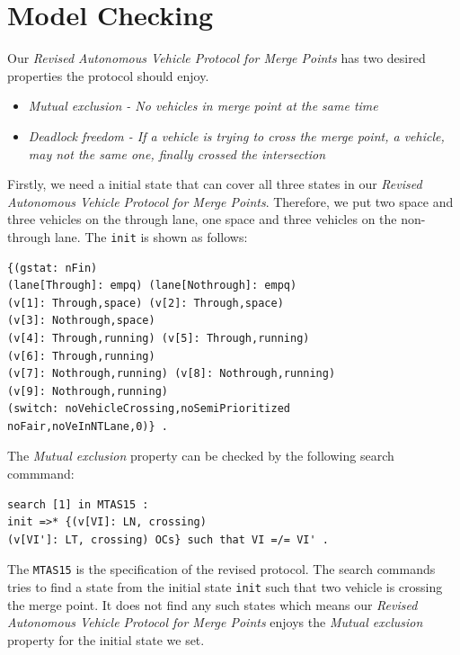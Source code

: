 \documentclass[10pt, conference, compsocconf]{IEEEtran}
\begin{document}
 
\section{Model Checking}
 \label{sect_model}
Our \textit{Revised Autonomous Vehicle Protocol for Merge Points} has two desired properties the protocol should enjoy.
\begin{itemize}
    \item \textit{Mutual exclusion - No vehicles in merge point at the same time}
    \item \textit{Deadlock freedom - If a vehicle is trying to cross the merge point, a vehicle, may not the same one, finally crossed the intersection}
\end{itemize}

Firstly, we need a initial state that can cover all three states in our \textit{Revised Autonomous Vehicle Protocol for Merge Points}.
Therefore, we put two space and three vehicles on the through lane, one space and three vehicles on the non-through lane.
The \verb!init! is shown as follows:

\begin{footnotesize}
\begin{verbatim}
{(gstat: nFin) 
(lane[Through]: empq) (lane[Nothrough]: empq) 
(v[1]: Through,space) (v[2]: Through,space) 
(v[3]: Nothrough,space)
(v[4]: Through,running) (v[5]: Through,running) 
(v[6]: Through,running)
(v[7]: Nothrough,running) (v[8]: Nothrough,running)
(v[9]: Nothrough,running)
(switch: noVehicleCrossing,noSemiPrioritized
noFair,noVeInNTLane,0)} .
\end{verbatim}
\end{footnotesize}

The \textit{Mutual exclusion} property can be checked by the following search commmand:

\begin{footnotesize}
\begin{verbatim}
search [1] in MTAS15 : 
init =>* {(v[VI]: LN, crossing) 
(v[VI']: LT, crossing) OCs} such that VI =/= VI' .
\end{verbatim}
\end{footnotesize}

The \verb!MTAS15! is the specification of the revised protocol.
The search commands tries to find a state from the initial state \verb!init! such that two vehicle is crossing the merge point.
It does not find any such states which means our \textit{Revised Autonomous Vehicle Protocol for Merge Points} enjoys the \textit{Mutual exclusion} property for the initial state we set.
\end{document}
